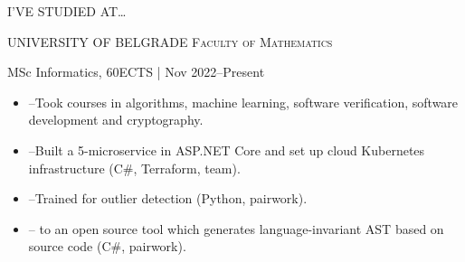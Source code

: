 \begin{minipage}[t]{\linewidth}\vspace{\sectionTopmargin}
{\titleFont\light I'VE STUDIED AT\ldots}\newline

\vspace{\titleBottomMargin}


{\subtitleFont\bold UNIVERSITY OF BELGRADE \vspace{0.75mm}\newline\extraLight\scshape Faculty of Mathematics}\newline

{\vspace{-3mm}\dateFont\extraLight MSc Informatics, 60ECTS | Nov 2022--Present}\newline
\vspace{-3mm}
{\contentFont \begin{itemize}
    \item --Took courses in algorithms, machine learning, software verification, software development and cryptography.
    \item --Built a 5-microservice  in ASP.NET Core and set up cloud Kubernetes infrastructure (C\#, Terraform, team).
    \item --Trained  for outlier detection (Python, pairwork).
    \item -- to an open source tool which generates language-invariant AST based on source code (C\#, pairwork).
\end{itemize}}
\end{minipage}\newline%
%

